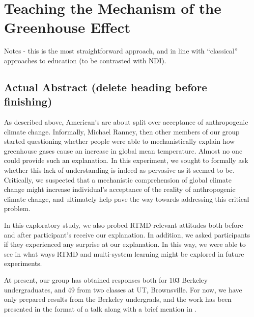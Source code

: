 \graphicspath{{mechanism/}}

\chapter{Teaching the Mechanism of the Greenhouse Effect}
\label{chap:mechanism}


Notes - this is the most straightforward approach, and in line with
``classical'' approaches to education (to be contrasted with NDI).

\section{Actual Abstract (delete heading before finishing)}

As described above, American's are about split over acceptance of anthropogenic
climate change. Informally, Michael Ranney, then other members of our group
started questioning whether people were able to mechanistically explain how
greenhouse gases cause an increase in global mean temperature. Almost no one
could provide such an explanation. In this experiment, we sought to formally ask
whether this lack of understanding is indeed as pervasive as it seemed to be.
Critically, we suspected that a mechanistic comprehension of global climate
change might increase individual's acceptance of the reality of anthropogenic
climate change, and ultimately help pave the way towards addressing this
critical problem.

In this exploratory study, we also probed RTMD-relevant attitudes both
before and after participant's receive our explanation. In addition, we asked
participants if they experienced any surprise at our explanation. In this way,
we were able to see in what ways RTMD and multi-system learning might be
explored in future experiments.


At present, our group has obtained responses both for 103 Berkeley
undergraduates, and 49 from two classes at UT, Brownsville. For now, we have
only prepared results from the Berkeley undergrads, and the work has been
presented in the format of a talk along with a brief mention in
\citeauthor{ranney_why_inpress}.  

